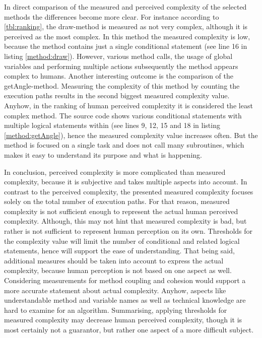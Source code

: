\documentclass[conference]{IEEEtran}
\newcommand{\lref}[1]{listing \ref{#1}}%
\begin{document}
In direct comparison of the measured and perceived complexity of the selected methods the differences become more clear. For instance according to \cref{tbl:ranking}, the draw-method is measured as not very complex, although it is perceived as the most complex. In this method the measured complexity is low, because the method contains just a single conditional statement (see line 16 in \lref{method:draw}). However, various method calls, the usage of global variables and performing multiple actions subsequently the method appears complex to humans. Another interesting outcome is the comparison of the getAngle-method. Measuring the complexity of this method by counting the execution paths results in the second biggest measured complexity value. Anyhow, in the ranking of human perceived complexity it is considered the least complex method. The source code shows various conditional statements with multiple logical statements within (see lines 9, 12, 15 and 18 in \lref{method:getAngle}), hence the measured complexity value increases often. But the method is focused on a single task and does not call many subroutines, which makes it easy to understand its purpose and what is happening.

In conclusion, perceived complexity is more complicated than measured complexity, because it is subjective and takes multiple aspects into account. In contrast to the perceived complexity, the presented measured complexity focuses solely on the total number of execution paths. For that reason, measured complexity is not sufficient enough to represent the actual human perceived complexity. Although, this may not hint that measured complexity is bad, but rather is not sufficient to represent human perception on its own. Thresholds for the complexity value will limit the number of conditional and related logical statements, hence will support the ease of understanding. That being said, additional measures should be taken into account to express the actual complexity, because human perception is not based on one aspect as well. Considering measurements for method coupling and cohesion would support a more accurate statement about actual complexity. Anyhow, aspects like understandable method and variable names as well as technical knowledge are hard to examine for an algorithm. Summarising, applying thresholds for measured complexity may decrease human perceived complexity, though it is most certainly not a guarantor, but rather one aspect of a more difficult subject.

\end{document}
